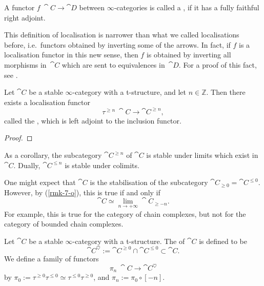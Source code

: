 \begin{definition}
    A functor $f\:\cat{C}\to\cat{D}$ between $\infty$-categories
    is called a , if 
    it has a fully faithful right adjoint.
\end{definition}

\begin{remark}
    This definition of localisation
    is narrower than what we called localisations before,
    i.e.\ functors obtained by inverting some of the arrows.
    In fact, if $f$ is a localisation functor in this new sense,
    then $f$ is obtained by inverting all morphisms in~$\cat{C}$
    which are sent to equivalences in~$\cat{D}$.
    For a proof of this fact, see \cite[Proposition~5.2.7.12]{htt}. \varqed
\end{remark}

\begin{theorem}
    Let $\cat{C}$ be a stable $\infty$-category with a t-structure,
    and let $n\in\mathbb Z$. Then there exists a localisation functor
    \[ \tau^{\geq n}\:\cat{C}\to\cat{C}^{\geq n}, \]
    called the , which is left adjoint
    to the inclusion functor.
\end{theorem}

\begin{proof}
    \nyw
\end{proof}

As a corollary, the subcategory $\cat{C}^{\geq n}$ of $\cat{C}$
is stable under limits which exist in $\cat{C}$.
Dually, $\cat{C}^{\leq n}$ is stable under colimits.

\begin{remark}
    One might expect that $\cat{C}$ is the stabilisation of
    the subcategory $\cat{C}_{\geq0}=\cat{C}^{\leq0}$.
    However, by (\ref{rmk-7-o}), this is true if and only if 
    \[\cat{C}\simeq\lim_{n\to+\infty}\cat{C}_{\geq-n}.\]
    For example, this is true for the category of chain complexes,
    but not for the category of bounded chain complexes.
\end{remark}

\begin{definition}
    Let $\cat{C}$ be a stable $\infty$-category with a t-structure.
    The  of $\cat{C}$ is defined to be 
    \[ \cat{C}^\heartsuit:=\cat{C}^{\geq0}\cap\cat{C}^{\leq0}\subset\cat{C}. \]
    We define a family of functors
    \[ \pi_n\:\cat{C}\to\cat{C}^\heartsuit \]
    by $\pi_0:=\tau^{\geq0}\tau^{\leq0}\simeq\tau^{\leq0}\tau^{\geq0}$,
    and $\pi_n:=\pi_0\circ[-n]$.
\end{definition}

